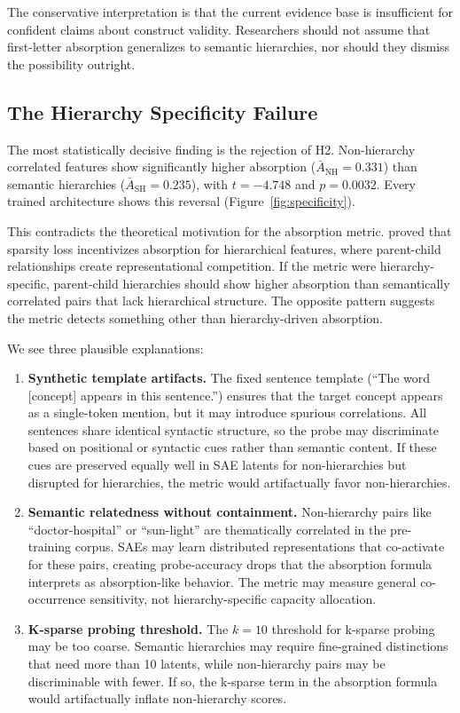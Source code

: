 \documentclass{article}
\begin{document}
The conservative interpretation is that the current evidence base is insufficient for confident claims about construct validity. Researchers should not assume that first-letter absorption generalizes to semantic hierarchies, nor should they dismiss the possibility outright.

\subsection{The Hierarchy Specificity Failure}

The most statistically decisive finding is the rejection of H2. Non-hierarchy correlated features show significantly higher absorption ($\bar{A}_{\text{NH}} = 0.331$) than semantic hierarchies ($\bar{A}_{\text{SH}} = 0.235$), with $t = -4.748$ and $p = 0.0032$. Every trained architecture shows this reversal (Figure~\ref{fig:specificity}).

This contradicts the theoretical motivation for the absorption metric. \citet{chanin2024feature} proved that sparsity loss incentivizes absorption for hierarchical features, where parent-child relationships create representational competition. If the metric were hierarchy-specific, parent-child hierarchies should show higher absorption than semantically correlated pairs that lack hierarchical structure. The opposite pattern suggests the metric detects something other than hierarchy-driven absorption.

We see three plausible explanations:

\begin{enumerate}
\item \textbf{Synthetic template artifacts.} The fixed sentence template (``The word [concept] appears in this sentence.'') ensures that the target concept appears as a single-token mention, but it may introduce spurious correlations. All sentences share identical syntactic structure, so the probe may discriminate based on positional or syntactic cues rather than semantic content. If these cues are preserved equally well in SAE latents for non-hierarchies but disrupted for hierarchies, the metric would artifactually favor non-hierarchies.

\item \textbf{Semantic relatedness without containment.} Non-hierarchy pairs like ``doctor-hospital'' or ``sun-light'' are thematically correlated in the pre-training corpus. SAEs may learn distributed representations that co-activate for these pairs, creating probe-accuracy drops that the absorption formula interprets as absorption-like behavior. The metric may measure general co-occurrence sensitivity, not hierarchy-specific capacity allocation.

\item \textbf{K-sparse probing threshold.} The $k = 10$ threshold for k-sparse probing may be too coarse. Semantic hierarchies may require fine-grained distinctions that need more than 10 latents, while non-hierarchy pairs may be discriminable with fewer. If so, the k-sparse term in the absorption formula would artifactually inflate non-hierarchy scores.
\end{enumerate}
\end{document}
